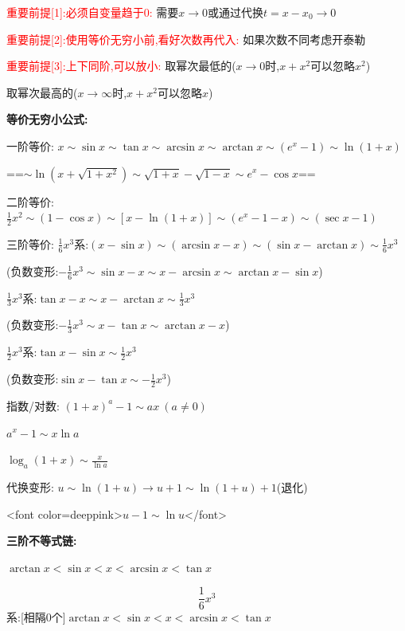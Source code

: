 \documentclass[11pt,a4paper,UTF8]{ctexart}
\begin{document}
\begin{thmbox}[{解法[3]: [代数]等价无穷小比阶}]

\textcolor{red}{重要前提[1]:必须自变量趋于0:}		      需要$x \to 0$或通过代换$t = x - x_0 \to 0$

\textcolor{red}{重要前提[2]:使用等价无穷小前,看好次数再代入:}	如果次数不同考虑开泰勒

\textcolor{red}{重要前提[3]:上下同阶,可以放小:}		    取幂次最低的($x \to 0$时,$x+x^2$可以忽略$x^2$)

						取幂次最高的($x \to \infty$时,$x+x^2$可以忽略$x$)

\textbf{等价无穷小公式:}

  一阶等价:	$x \sim \sin x \sim \tan x \sim \arcsin x \sim \arctan x \sim (e^x - 1) \sim \ln(1+x)$

  		==$\sim \ln(x+\sqrt{1+x^2}) \sim \sqrt{1+x} - \sqrt{1-x} \sim e^x - \cos x$==	

  二阶等价:	$\frac{1}{2}x^2 \sim (1 - \cos x) \sim [x - \ln(1+x)] \sim (e^x - 1 - x) \sim (\sec x - 1)$

  三阶等价:	$\frac{1}{6}x^3$系:$(x - \sin x) \sim (\arcsin x - x) \sim (\sin x - \arctan x) \sim \frac{1}{6}x^3$

  			(负数变形:$- \frac{1}{6}x^3 \sim \sin x - x \sim x - \arcsin x \sim \arctan x - \sin x$)

  		$\frac{1}{3}x^3$系:$\tan x - x \sim x - \arctan x \sim \frac{1}{3}x^3$

  			(负数变形:$- \frac{1}{3}x^3 \sim x - \tan x \sim \arctan x - x$)

  		$\frac{1}{2}x^3$系:$\tan x - \sin x \sim \frac{1}{2}x^3$

  			(负数变形:$\sin x - \tan x \sim - \frac{1}{2}x^3$)

  指数/对数:    $(1+x)^a - 1 \sim a x\ (a \neq 0)$

  		$a^x - 1 \sim x \ln a$

  		$\log_a(1+x) \sim \frac{x}{\ln a}$

  代换变形:	$u \sim \ln(1+u) \to u+1 \sim \ln(1+u)+1$(退化) 

  		<font color=deeppink>$u-1 \sim \ln u$</font>

\textbf{三阶不等式链:} 

$\arctan x < \sin x < x < \arcsin x < \tan x$

  
\begin{equation*}
\frac{1}{6}x^3
\end{equation*}
系:[相隔0个]$\arctan x < \sin x < x < \arcsin x < \tan x$


\end{thmbox}
\end{document}
